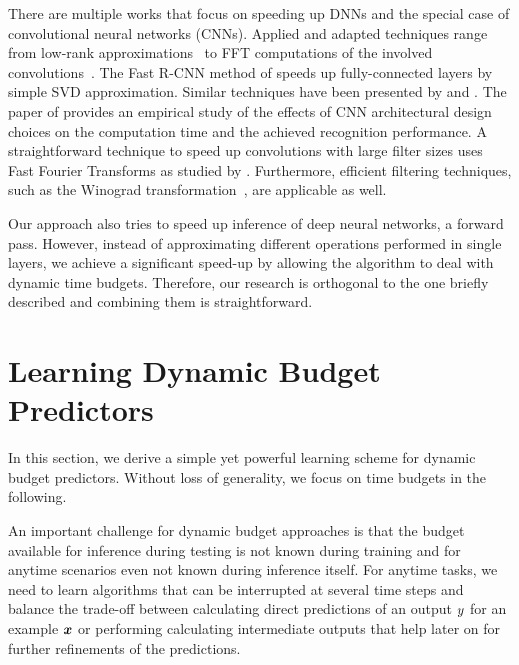 \documentclass{bmvc2k}
\begin{document}
    There are multiple works that focus on speeding up DNNs and the special case of 
    convolutional neural networks (CNNs). Applied and adapted techniques
    range from low-rank approximations~\cite{jaderberg2014speeding,girshick2014rich,denton2014exploiting} to
    FFT computations of the involved convolutions~\cite{mathieu2013fast}.
    The Fast R-CNN method of \cite{girshick2014rich} speeds up fully-connected layers by simple SVD approximation.
    Similar techniques have been presented by \cite{denton2014exploiting} and \cite{jaderberg2014speeding}.
    The paper of \cite{He14:CNN} provides an empirical study of the effects of CNN architectural design choices
    on the computation time and the achieved recognition performance.
    A straightforward technique to speed up convolutions with large filter sizes uses Fast Fourier Transforms as
    studied by \cite{mathieu2013fast}. Furthermore, efficient filtering techniques, such as the Winograd transformation~\cite{lavin2015fast},
    are applicable as well.

    Our approach also tries to speed up inference of deep neural networks, \ie a forward pass. However,
    instead of approximating different operations performed in single layers, we achieve a significant speed-up by
    allowing the algorithm to deal with dynamic time budgets. Therefore, our research is orthogonal to the one briefly described 
    and combining them is straightforward.

\section{Learning Dynamic Budget Predictors}
\label{sec:anytimepred}

In this section, we derive a simple yet powerful learning scheme for dynamic budget predictors. Without
loss of generality, we focus on time budgets in the following.

    An important challenge for dynamic budget approaches is that the budget available for
    inference during testing is not known during training and for anytime scenarios even not known
    during inference itself. 
    For anytime tasks, we need to learn algorithms that can be interrupted at several time steps
    and balance the trade-off between calculating direct predictions of an output $y$
    for an example $\bm{x}$ or performing calculating intermediate outputs that help later
    on for further refinements of the predictions.
\end{document}
